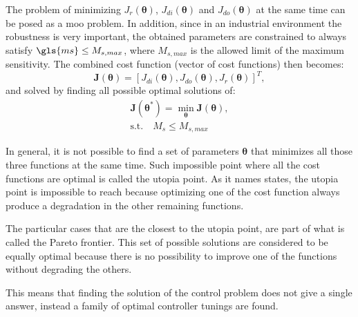 The problem of minimizing $J_r(\bm{\theta})$, $J_{di}(\bm{\theta})$ and $J_{do}(\bm{\theta})$ at the same time can be posed as a \gls{moo} problem. In addition, since in an industrial environment the robustness is very important, the obtained parameters are constrained to always satisfy  $\gls{ms} \leq M_{s,max}$, where $M_{s,max}$ is the allowed limit of the maximum sensitivity. The combined cost function (vector of cost functions) then becomes:
%
\begin{equation}  %
\textbf{J}(\bm{\theta})=\left[J_{di}(\bm{\theta}), J_{do}(\bm{\theta}), J_{r}(\bm{\theta})\right]^T,
\label{eq:Jtotal}
\end{equation}
%
and solved by finding all possible optimal solutions of:
%
\begin{equation}  %
\begin{gathered}
\textbf{J}(\bm{\theta}^*) = \min_{\bm{\theta}} \textbf{J}(\bm{\theta}),\\
\text{s.t.} \quad  M_s \leq M_{s,max}
\end{gathered}
\label{eq:probmoo}
\end{equation}

In general, it is not possible to find a set of parameters $\bm{\theta}$ that minimizes all those three functions at the same time. Such impossible point where all the cost functions are optimal is called the utopia point. As it names states, the utopia point is impossible to reach because optimizing one of the cost function always produce a degradation in the other remaining functions.

The particular cases that are  the closest to the utopia point, are part of what is called the Pareto frontier. This set of possible solutions are considered to be equally optimal because there is no possibility to improve one of the functions without degrading the others.

This means that finding the solution of the control problem does not give a single answer, instead a family of optimal controller tunings are found.

